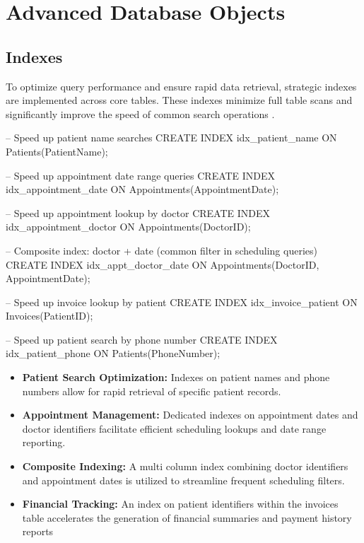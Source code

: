 \section{Advanced Database Objects}

\subsection{Indexes}
\label{sec:5.1}
To optimize query performance and ensure rapid data retrieval, strategic indexes are implemented across core tables. These indexes minimize full table scans and significantly improve the speed of common search operations \cite{mysql_stored_programs}.

\begin{sqlcode}
-- Speed up patient name searches
CREATE INDEX idx_patient_name
    ON Patients(PatientName);

-- Speed up appointment date range queries
CREATE INDEX idx_appointment_date
    ON Appointments(AppointmentDate);

-- Speed up appointment lookup by doctor
CREATE INDEX idx_appointment_doctor
    ON Appointments(DoctorID);

-- Composite index: doctor + date (common filter in scheduling queries)
CREATE INDEX idx_appt_doctor_date
    ON Appointments(DoctorID, AppointmentDate);

-- Speed up invoice lookup by patient
CREATE INDEX idx_invoice_patient
    ON Invoices(PatientID);

-- Speed up patient search by phone number
CREATE INDEX idx_patient_phone
    ON Patients(PhoneNumber);
\end{sqlcode}

\begin{itemize}
    \item \textbf{Patient Search Optimization:} Indexes on patient names and phone numbers allow for rapid retrieval of specific patient records.
    \item \textbf{Appointment Management:} Dedicated indexes on appointment dates and doctor identifiers facilitate efficient scheduling lookups and date range reporting.
    \item \textbf{Composite Indexing:} A multi column index combining doctor identifiers and appointment dates is utilized to streamline frequent scheduling filters.
    \item \textbf{Financial Tracking:} An index on patient identifiers within the invoices table accelerates the generation of financial summaries and payment history reports
\end{itemize}

